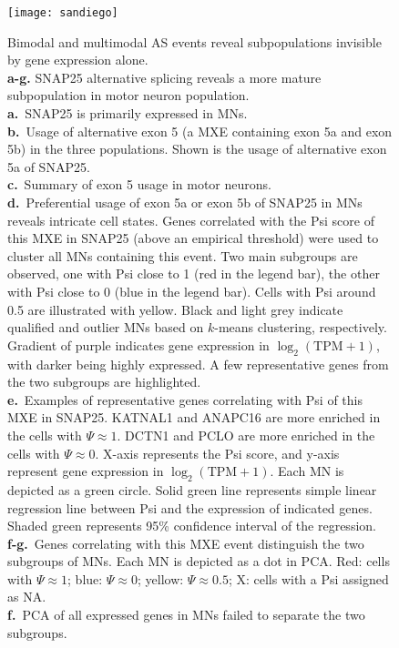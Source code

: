 \begin{figure}[h] 
  \centering
  \texttt{[image: sandiego]}
  \caption[Bimodal and multimodal AS events reveal subpopulations invisible by gene expression alone.]{Bimodal and multimodal AS events reveal subpopulations invisible by gene expression alone.\\
\textbf{a-g.} SNAP25 alternative splicing reveals a more mature subpopulation in motor neuron population.\\
\textbf{a.}~SNAP25 is primarily expressed in MNs. \\
\textbf{b.}~Usage of alternative exon 5 (a MXE containing exon 5a and exon 5b) in the three populations. Shown is the usage of alternative exon 5a of SNAP25. \\
\textbf{c.}~Summary of exon 5 usage in motor neurons.\\
\textbf{d.}~Preferential usage of exon 5a or exon 5b of SNAP25 in MNs reveals intricate cell states. Genes correlated with the Psi score of this MXE in SNAP25 (above an empirical threshold) were used to cluster all MNs containing this event. Two main subgroups are observed, one with Psi close to 1 (red in the legend bar), the other with Psi close to 0 (blue in the legend bar). Cells with Psi around 0.5 are illustrated with yellow. Black and light grey indicate qualified and outlier MNs based on $k$-means clustering, respectively. Gradient of purple indicates gene expression in $\log_2(\text{TPM}+1)$, with darker being highly expressed. A few representative genes from the two subgroups are highlighted. \\
\textbf{e.}~Examples of representative genes correlating with Psi of this MXE in SNAP25. KATNAL1 and ANAPC16 are more enriched in the cells with $\Psi \approx 1$. DCTN1 and PCLO are more enriched in the cells with $\Psi \approx 0$. X-axis represents the Psi score, and y-axis represent gene expression in $\log_2(\text{TPM}+1)$. Each MN is depicted as a green circle. Solid green line represents simple linear regression line between Psi and the expression of indicated genes. Shaded green represents 95\% confidence interval of the regression.\\
\textbf{f-g.}~Genes correlating with this MXE event distinguish the two subgroups of MNs. Each MN is depicted as a dot in PCA.  Red: cells with $\Psi \approx 1$; blue: $\Psi \approx 0$; yellow: $\Psi \approx 0.5$; X: cells with a Psi assigned as NA.\\
\textbf{f.}~PCA of all expressed genes in MNs failed to separate the two subgroups.\\
}
\end{figure}
